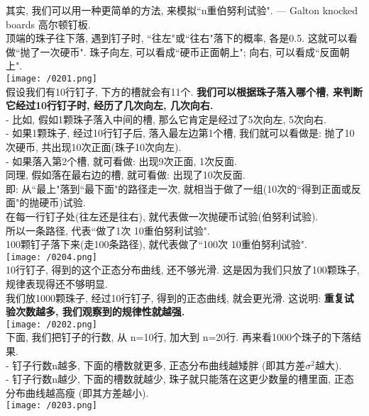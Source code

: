 \documentclass[UTF8]{ctexart}
\begin{document}
	\begin{myEnvSample}
		其实, 我们可以用一种更简单的方法, 来模拟``n重伯努利试验". --- Galton knocked boards 高尔顿钉板. \\
		
		顶端的珠子往下落, 遇到钉子时, ``往左"或``往右"落下的概率, 各是0.5. 这就可以看做``抛了一次硬币". 珠子向左, 可以看成``硬币正面朝上"; 向右, 可以看成``反面朝上". \\
		
		\texttt{[image: /0201.png]} \\
				
		假设我们有10行钉子, 下方的槽就会有11个. \textbf{我们可以根据珠子落入哪个槽, 来判断它经过10行钉子时, 经历了几次向左, 几次向右.} \\
		- 比如, 假如1颗珠子落入中间的槽, 那么它肯定是经过了5次向左, 5次向右. \\
		- 如果1颗珠子, 经过10行钉子后, 落入最左边第1个槽, 我们就可以看做是: 抛了10次硬币, 共出现10次正面(珠子10次向左). \\
		- 如果落入第2个槽, 就可看做: 出现9次正面, 1次反面. \\
		同理, 假如落在最右边的槽, 就可看做: 出现了10次反面. \\
		
		即: 从``最上"落到``最下面"的路径走一次, 就相当于做了一组(10次的``得到正面或反面"的抛硬币)试验. \\
		在每一行钉子处(往左还是往右), 就代表做一次抛硬币试验(伯努利试验). \\
		所以一条路径, 代表``做了1次 10重伯努利试验". \\
		100颗钉子落下来(走100条路径), 就代表做了``100次 10重伯努利试验". \\		
		
		\texttt{[image: /0204.png]} \\
		
		10行钉子, 得到的这个正态分布曲线, 还不够光滑. 这是因为我们只放了100颗珠子, 规律表现得还不够明显. \\
		我们放1000颗珠子, 经过10行钉子, 得到的正态曲线, 就会更光滑. 这说明: \textbf{重复试验次数越多, 我们观察到的规律性就越强.} \\
		
		\texttt{[image: /0202.png]} \\		
		
		
		下面, 我们把钉子的行数, 从 n=10行, 加大到 n=20行. 再来看1000个珠子的下落结果. \\
		- 钉子行数n越多, 下面的槽数就更多, 正态分布曲线越矮胖 (即其方差$\sigma^2$越大).  \\		
		- 钉子行数n越少, 下面的槽数就越少, 珠子就只能落在这更少数量的槽里面, 正态分布曲线越高瘦 (即其方差越小).  \\		
		
		
		\texttt{[image: /0203.png]} 	
		\end{myEnvSample}
	\vspace{1em} 
	
\end{document}
